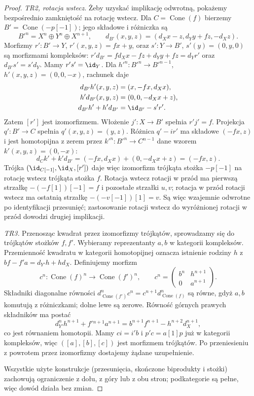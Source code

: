 \begin{proof}
\emph{TR2, rotacja wstecz.} Żeby uzyskać implikację odwrotną, pokażemy bezpośrednio zamkniętość na rotację wstecz. Dla $C=\operatorname{Cone}(f)$ bierzemy $B'=\operatorname{Cone}(-p[-1])$; jego składowe i różniczka są
\[
 B'^n=X^n\oplus Y^n\oplus X^{n+1},\qquad
 d_{B'}(x,y,z)=(d_Xx-z,d_Yy+fz,-d_Xz).
\]
Morfizmy $r':B'\to Y$, $r'(x,y,z)=fx+y$, oraz $s':Y\to B'$, $s'(y)=(0,y,0)$ są morfizmami kompleksów: $r'd_{B'}=fd_Xx-fz+d_Yy+fz=d_Yr'$ oraz $d_{B'}s'=s'd_Y$. Mamy $r's'=\id_Y$. Dla $h'^n:B'^n\to B'^{n-1}$, $h'(x,y,z)=(0,0,-x)$, rachunek daje
\[
 \begin{aligned}
 d_{B'}h'(x,y,z)&=(x,-fx,d_Xx),\\
 h'd_{B'}(x,y,z)&=(0,0,-d_Xx+z),\\
 d_{B'}h'+h'd_{B'}&=\id_{B'}-s'r'.
\end{aligned}
\]
Zatem $[r']$ jest izomorfizmem. Włożenie $j':X\to B'$ spełnia $r'j'=f$. Projekcja $q':B'\to C$ spełnia $q'(x,y,z)=(y,z)$. Różnica $q'-ir'$ ma składowe $(-fx,z)$ i jest homotopijna z zerem przez $k'^n:B'^n\to C^{n-1}$ dane wzorem $k'(x,y,z)=(0,-x)$:
\[
 d_Ck'+k'd_{B'}=(-fx,d_Xx)+(0,-d_Xx+z)=(-fx,z).
\]
Trójka $(\id_{C[-1]},\id_X,[r'])$ daje więc izomorfizm trójkąta stożka $-p[-1]$ na rotację wstecz trójkąta stożka $f$. Rotacja wstecz rotacji w przód ma pierwszą strzałkę $-(-f[1])[-1]=f$ i pozostałe strzałki $u,v$; rotacja w przód rotacji wstecz ma ostatnią strzałkę $-(-v[-1])[1]=v$. Są więc wzajemnie odwrotne po identyfikacji przesunięć; zastosowanie rotacji wstecz do wyróżnionej rotacji w przód dowodzi drugiej implikacji.

\emph{TR3.} Przenosząc kwadrat przez izomorfizmy trójkątów, sprowadzamy się do trójkątów stożków $f,f'$. Wybieramy reprezentanty $a,b$ w kategorii kompleksów. Przemienność kwadratu w kategorii homotopijnej oznacza istnienie rodziny $h$ z $bf-f'a=d_{Y'}h+hd_X$. Definiujemy morfizm
\[
 c^n:\operatorname{Cone}(f)^n\to\operatorname{Cone}(f')^n,\qquad
 c^n=\begin{pmatrix}b^n&h^{n+1}\\0&a^{n+1}\end{pmatrix}.
\]
Składniki diagonalne równości $d_{\operatorname{Cone}(f')}^nc^n=c^{n+1}d_{\operatorname{Cone}(f)}^n$ są równe, gdyż $a,b$ komutują z różniczkami; dolne lewe są zerowe. Równość górnych prawych składników ma postać
\[
 d_{Y'}^nh^{n+1}+f'{}^{n+1}a^{n+1}
 =b^{n+1}f^{n+1}-h^{n+2}d_X^{n+1},
\]
co jest równaniem homotopii. Mamy $ci=i'b$ i $p'c=a[1]p$ już w kategorii kompleksów, więc $([a],[b],[c])$ jest morfizmem trójkątów. Po przeniesieniu z powrotem przez izomorfizmy dostajemy żądane uzupełnienie.

Wszystkie użyte konstrukcje (przesunięcia, skończone biprodukty i stożki) zachowują ograniczenie z dołu, z góry lub z obu stron; podkategorie są pełne, więc dowód działa bez zmian.
\end{proof}
